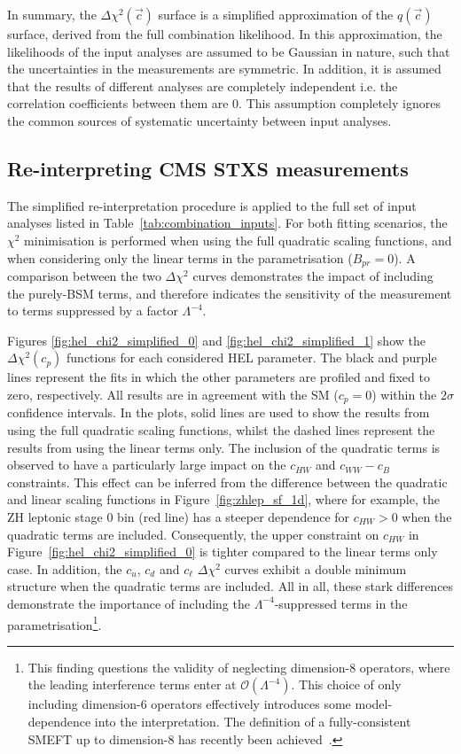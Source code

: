 In summary, the $\Delta\chi^2(\vec{c})$ surface is a simplified approximation of the $q(\vec{c})$ surface, derived from the full combination likelihood. In this approximation, the likelihoods of the input analyses are assumed to be Gaussian in nature, such that the uncertainties in the measurements are symmetric. In addition, it is assumed that the results of different analyses are completely independent i.e. the correlation coefficients between them are 0. This assumption completely ignores the common sources of systematic uncertainty between input analyses.

\subsection{Re-interpreting CMS STXS measurements}\label{sec:hel_simplified_cms}
The simplified re-interpretation procedure is applied to the full set of input analyses listed in Table~\ref{tab:combination_inputs}. For both fitting scenarios, the $\chi^2$ minimisation is performed when using the full quadratic scaling functions, and when considering only the linear terms in the parametrisation ($B_{pr}=0$). A comparison between the two $\Delta\chi^2$ curves demonstrates the impact of including the purely-BSM terms, and therefore indicates the sensitivity of the measurement to terms suppressed by a factor $\Lambda^{-4}$. 

Figures \ref{fig:hel_chi2_simplified_0} and \ref{fig:hel_chi2_simplified_1} show the $\Delta\chi^2(c_p)$ functions for each considered HEL parameter. The black and purple lines represent the fits in which the other parameters are profiled and fixed to zero, respectively. All results are in agreement with the SM ($c_p=0$) within the $2\sigma$ confidence intervals. In the plots, solid lines are used to show the results from using the full quadratic scaling functions, whilst the dashed lines represent the results from using the linear terms only. The inclusion of the quadratic terms is observed to have a particularly large impact on the $c_{HW}$ and $c_{WW}-c_B$ constraints. This effect can be inferred from the difference between the quadratic and linear scaling functions in Figure~\ref{fig:zhlep_sf_1d}, where for example, the ZH leptonic stage 0 bin (red line) has a steeper dependence for $c_{HW}>0$ when the quadratic terms are included. Consequently, the upper constraint on $c_{HW}$ in Figure~\ref{fig:hel_chi2_simplified_0} is tighter compared to the linear terms only case. In addition, the $c_u$, $c_d$ and $c_{\ell}$ $\Delta\chi^2$ curves exhibit a double minimum structure when the quadratic terms are included. All in all, these stark differences demonstrate the importance of including the $\Lambda^{-4}$-suppressed terms in the parametrisation\footnote{This finding questions the validity of neglecting dimension-8 operators, where the leading interference terms enter at $\mathcal{O}(\Lambda^{-4})$. This choice of only including dimension-6 operators effectively introduces some model-dependence into the interpretation. The definition of a fully-consistent SMEFT up to dimension-8 has recently been achieved~\cite{Murphy:2020rsh}.}.

